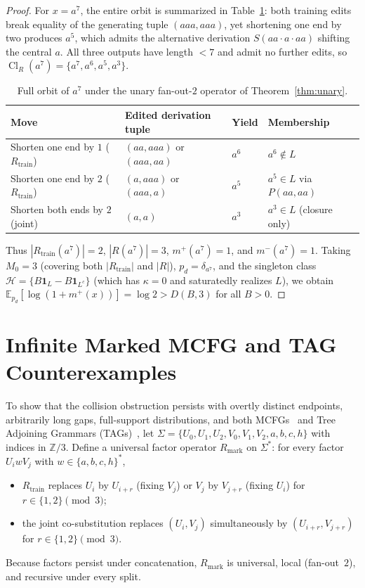 \documentclass[11pt]{article}
\theoremstyle{plain}
\theoremstyle{definition}
\theoremstyle{remark}
\DeclareMathOperator{\Cl}{Cl}
\begin{document}
\begin{proof}
For $x = a^7$, the entire orbit is summarized in Table~\ref{tab:unary}: both training edits break equality of the generating tuple $(aaa, aaa)$, yet shortening one end by two produces $a^5$, which admits the alternative derivation $S(aa \cdot a \cdot aa)$ shifting the central $a$. All three outputs have length $< 7$ and admit no further edits, so $\Cl_R(a^7) = \{a^7, a^6, a^5, a^3\}$.
\begin{table}[ht]
\centering
\small
\begin{tabular}{@{}llll@{}}
\toprule
Move & Edited derivation tuple & Yield & Membership \\
\midrule
Shorten one end by $1$ ($R_{\mathrm{train}}$) & $(aa, aaa)$ or $(aaa, aa)$ & $a^6$ & $a^6 \notin L$ \\
Shorten one end by $2$ ($R_{\mathrm{train}}$) & $(a, aaa)$ or $(aaa, a)$ & $a^5$ & $a^5 \in L$ via $P(aa, aa)$ \\
Shorten both ends by $2$ (joint) & $(a, a)$ & $a^3$ & $a^3 \in L$ (closure only) \\
\bottomrule
\end{tabular}
\caption{Full orbit of $a^7$ under the unary fan-out-$2$ operator of Theorem~\ref{thm:unary}.}\label{tab:unary}
\end{table}

Thus $|R_{\mathrm{train}}(a^7)| = 2$, $|R(a^7)| = 3$, $m^+(a^7) = 1$, and $m^-(a^7) = 1$. Taking $M_0 = 3$ (covering both $|R_{\mathrm{train}}|$ and $|R|$), $p_d = \delta_{a^7}$, and the singleton class $\mathcal{H} = \{B\mathbf{1}_L - B\mathbf{1}_{L^c}\}$ (which has $\kappa = 0$ and saturatedly realizes $L$), we obtain $\mathbb{E}_{p_d}[\log(1 + m^+(x))] = \log 2 > D(B, 3)$ for all $B > 0$.
\end{proof}

\section{Infinite Marked MCFG and TAG Counterexamples}

To show that the collision obstruction persists with overtly distinct endpoints, arbitrarily long gaps, full-support distributions, and both MCFGs~\cite{seki1991mcfg} and Tree Adjoining Grammars (TAGs)~\cite{joshi1985tag}, let $\Sigma = \{U_0, U_1, U_2, V_0, V_1, V_2, a, b, c, h\}$ with indices in $\mathbb{Z}/3$. Define a universal factor operator $R_{\mathrm{mark}}$ on $\Sigma^*$: for every factor $U_i w V_j$ with $w \in \{a, b, c, h\}^*$,
\begin{itemize}[leftmargin=2em,itemsep=1pt,topsep=3pt]
\item $R_{\mathrm{train}}$ replaces $U_i$ by $U_{i+r}$ (fixing $V_j$) or $V_j$ by $V_{j+r}$ (fixing $U_i$) for $r \in \{1, 2\} \pmod 3$;
\item the joint co-substitution replaces $(U_i, V_j)$ simultaneously by $(U_{i+r}, V_{j+r})$ for $r \in \{1, 2\} \pmod 3$.
\end{itemize}
Because factors persist under concatenation, $R_{\mathrm{mark}}$ is universal, local (fan-out~$2$), and recursive under every split.
\end{document}
